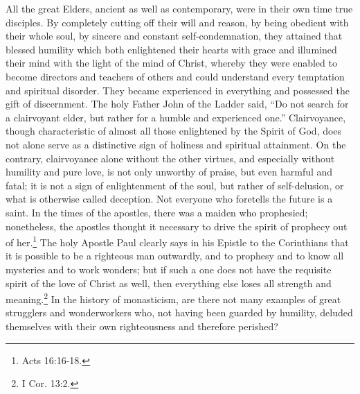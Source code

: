 All the great Elders, ancient as well as contemporary, were in their own time true disciples. By completely cutting off their will and reason, by being obedient with their whole soul, by sincere and constant self-condemnation, they attained that blessed humility which both enlightened their hearts with grace and illumined their mind with the light of the mind of Christ, whereby they were enabled to become directors and teachers of others and could understand every temptation and spiritual disorder. They became experienced in everything and possessed the gift of discernment. The holy Father John of the Ladder said, “Do not search for a clairvoyant elder, but rather for a humble and experienced one.” Clairvoyance, though characteristic of almost all those enlightened by the Spirit of God, does not alone serve as a distinctive sign of holiness and spiritual attainment. On the contrary, clairvoyance alone without the other virtues, and especially without humility and pure love, is not only unworthy of praise, but even harmful and fatal; it is not a sign of enlightenment of the soul, but rather of self-delusion, or what is otherwise called deception. Not everyone who foretells the future is a saint. In the times of the apostles, there was a maiden who prophesied; nonetheless, the apostles thought it necessary to drive the spirit of prophecy out of her.\footnote{Acts 16:16-18.} The holy Apostle Paul clearly says in his Epistle to the Corinthians that it is possible to be a righteous man outwardly, and to prophesy and to know all mysteries and to work wonders; but if such a one does not have the requisite spirit of the love of Christ as well, then everything else loses all strength and meaning.\footnote{I Cor. 13:2.} In the history of monasticism, are there not many examples of great strugglers and wonderworkers who, not having been guarded by humility, deluded themselves with their own righteousness and therefore perished?


